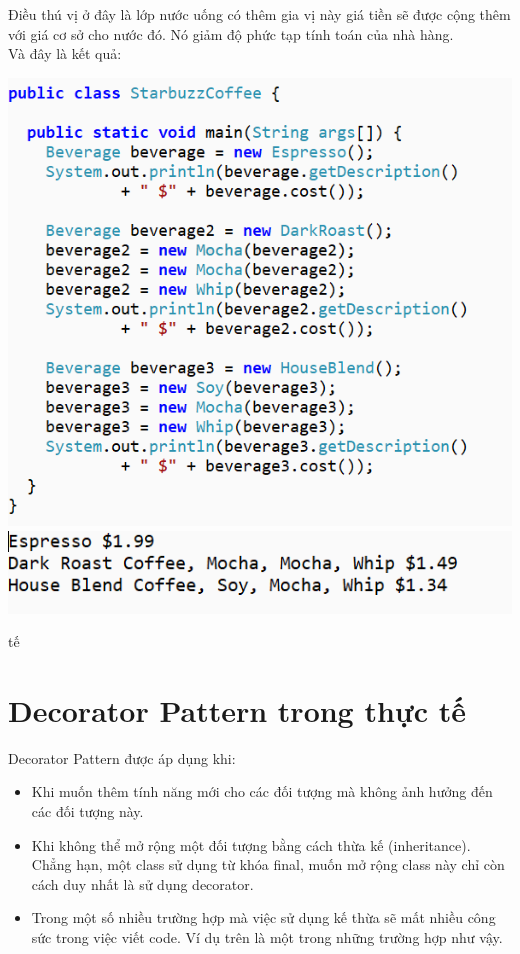 Điều thú vị ở đây là lớp nước uống có thêm gia vị này giá tiền sẽ được cộng thêm với giá cơ sở cho nước đó. Nó giảm độ phức tạp tính toán của nhà hàng.\\
Và đây là kết quả:
\begin{center}
	\includegraphics{GALLEYS/images/chapter4/images8}
	\includegraphics{GALLEYS/images/chapter4/images9}
\end{center}tế

\section{Decorator Pattern trong thực tế}
Decorator Pattern được áp dụng khi:

\begin{itemize}
	\item Khi muốn thêm tính năng mới cho các đối tượng mà không ảnh hưởng đến các đối tượng này.
	\item Khi không thể mở rộng một đối tượng bằng cách thừa kế (inheritance). Chẳng hạn, một class sử dụng từ khóa final, muốn mở rộng class này chỉ còn cách duy nhất là sử dụng decorator.
	\item Trong một số nhiều trường hợp mà việc sử dụng kế thừa sẽ mất nhiều công sức trong việc viết code. Ví dụ trên là một trong những trường hợp như vậy.
\end{itemize}
